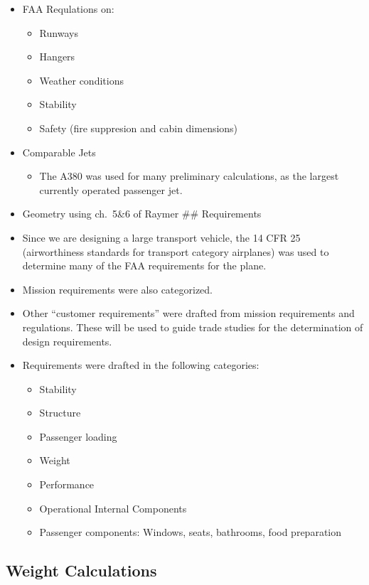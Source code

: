 \documentclass[10pt,twocolumn]{article}  %
\begin{document}
\begin{itemize}
\tightlist
\item
  FAA Requlations on:

  \begin{itemize}
  \tightlist
  \item
    Runways
  \item
    Hangers
  \item
    Weather conditions
  \item
    Stability
  \item
    Safety (fire suppresion and cabin dimensions)
  \end{itemize}
\item
  Comparable Jets

  \begin{itemize}
  \tightlist
  \item
    The A380 was used for many preliminary calculations, as the largest
    currently operated passenger jet.
  \end{itemize}
\item
  Geometry using ch.~5\&6 of Raymer \#\# Requirements
\item
  Since we are designing a large transport vehicle, the 14 CFR 25
  (airworthiness standards for transport category airplanes) was used to
  determine many of the FAA requirements for the plane.
\item
  Mission requirements were also categorized.
\item
  Other ``customer requirements'' were drafted from mission requirements
  and regulations. These will be used to guide trade studies for the
  determination of design requirements.
\item
  Requirements were drafted in the following categories:

  \begin{itemize}
  \tightlist
  \item
    Stability
  \item
    Structure
  \item
    Passenger loading
  \item
    Weight
  \item
    Performance
  \item
    Operational Internal Components
  \item
    Passenger components: Windows, seats, bathrooms, food preparation
  \end{itemize}
\end{itemize}

\subsection{Weight Calculations}\label{weight-calculations}
\end{document}
